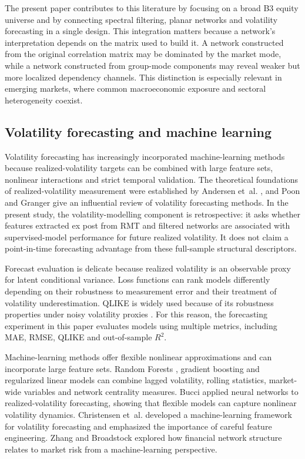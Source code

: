 The present paper contributes to this literature by focusing on a broad B3 equity universe and by connecting spectral filtering, planar networks and volatility forecasting in a single design. This integration matters because a network's interpretation depends on the matrix used to build it. A network constructed from the original correlation matrix may be dominated by the market mode, while a network constructed from group-mode components may reveal weaker but more localized dependency channels. This distinction is especially relevant in emerging markets, where common macroeconomic exposure and sectoral heterogeneity coexist.

\subsection{Volatility forecasting and machine learning}

Volatility forecasting has increasingly incorporated machine-learning methods because realized-volatility targets can be combined with large feature sets, nonlinear interactions and strict temporal validation. The theoretical foundations of realized-volatility measurement were established by Andersen et~al. \cite{andersen_2003_modeling}, and Poon and Granger \cite{poon_granger_2003} give an influential review of volatility forecasting methods. In the present study, the volatility-modelling component is retrospective: it asks whether features extracted ex post from RMT and filtered networks are associated with supervised-model performance for future realized volatility. It does not claim a point-in-time forecasting advantage from these full-sample structural descriptors.

Forecast evaluation is delicate because realized volatility is an observable proxy for latent conditional variance. Loss functions can rank models differently depending on their robustness to measurement error and their treatment of volatility underestimation. QLIKE is widely used because of its robustness properties under noisy volatility proxies \cite{patton_2011_volatility}. For this reason, the forecasting experiment in this paper evaluates models using multiple metrics, including MAE, RMSE, QLIKE and out-of-sample $R^2$.

Machine-learning methods offer flexible nonlinear approximations and can incorporate large feature sets. Random Forests \cite{breiman_2001_random}, gradient boosting \cite{friedman_2001_greedy} and regularized linear models \cite{hoerl_kennard_1970_ridge} can combine lagged volatility, rolling statistics, market-wide variables and network centrality measures. Bucci \cite{bucci_2020_realized} applied neural networks to realized-volatility forecasting, showing that flexible models can capture nonlinear volatility dynamics. Christensen et~al. \cite{christensen_2022_realized} developed a machine-learning framework for volatility forecasting and emphasized the importance of careful feature engineering. Zhang and Broadstock \cite{zhang_2023_network_volatility} explored how financial network structure relates to market risk from a machine-learning perspective.

